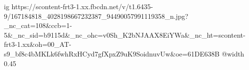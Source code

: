 
 
 
 
 

\ifcmt
  ig https://scontent-frt3-1.xx.fbcdn.net/v/t1.6435-9/167184818_4028198667232387_94490057991119358_n.jpg?_nc_cat=108&ccb=1-5&_nc_sid=b9115d&_nc_ohc=v0Sh_K2bNJAAX8EiYWa&_nc_ht=scontent-frt3-1.xx&oh=00_AT-s9_bf8c4bMKLk6fwhRxHCyd7gfXpxZ9uK9SoidnuvUw&oe=61DE638B
  @width 0.45
\fi
